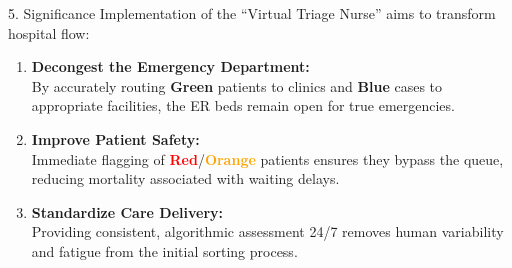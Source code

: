 \documentclass[aspectratio=169]{beamer}
\begin{document}
	\begin{frame}{5. Significance}
		Implementation of the ``Virtual Triage Nurse'' aims to transform hospital flow:
		
		\vspace{0.3cm}
		
		\begin{enumerate}
			\item \textbf{Decongest the Emergency Department:} \\
			By accurately routing \textcolor{green_triage}{\textbf{Green}} patients to clinics and \textcolor{blue_dead}{\textbf{Blue}} cases to appropriate facilities, the ER beds remain open for true emergencies.
			
			\item \textbf{Improve Patient Safety:} \\
			Immediate flagging of \textcolor{red}{\textbf{Red}}/\textcolor{orange}{\textbf{Orange}} patients ensures they bypass the queue, reducing mortality associated with waiting delays.
			
			\item \textbf{Standardize Care Delivery:} \\
			Providing consistent, algorithmic assessment 24/7 removes human variability and fatigue from the initial sorting process.
		\end{enumerate}
	\end{frame}
	
\end{document}
